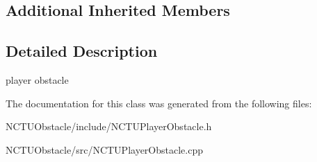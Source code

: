 \subsection*{Additional Inherited Members}


\subsection{Detailed Description}
player obstacle 

The documentation for this class was generated from the following files\+:\begin{DoxyCompactItemize}
\item 
N\+C\+T\+U\+Obstacle/include/N\+C\+T\+U\+Player\+Obstacle.\+h\item 
N\+C\+T\+U\+Obstacle/src/N\+C\+T\+U\+Player\+Obstacle.\+cpp\end{DoxyCompactItemize}
